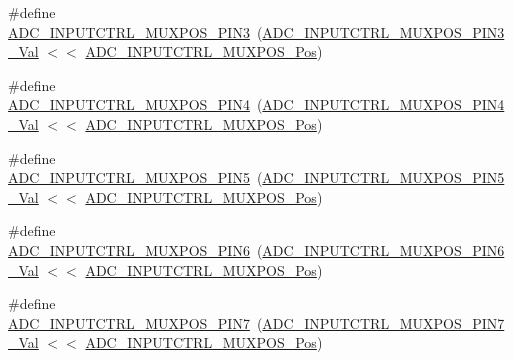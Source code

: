 \begin{DoxyCompactItemize}
\item 
\#define \mbox{\hyperlink{group___s_a_m_d21___a_d_c_gae40aae75717daad66136d38f4aab5745}{A\+D\+C\+\_\+\+I\+N\+P\+U\+T\+C\+T\+R\+L\+\_\+\+M\+U\+X\+P\+O\+S\+\_\+\+P\+I\+N3}}~(\mbox{\hyperlink{group___s_a_m_d21___a_d_c_gab3c2542ab94ed621d288448dea54595e}{A\+D\+C\+\_\+\+I\+N\+P\+U\+T\+C\+T\+R\+L\+\_\+\+M\+U\+X\+P\+O\+S\+\_\+\+P\+I\+N3\+\_\+\+Val}} $<$$<$ \mbox{\hyperlink{group___s_a_m_d21___a_d_c_ga583868be285e1c06c9a93dfd552d8c6a}{A\+D\+C\+\_\+\+I\+N\+P\+U\+T\+C\+T\+R\+L\+\_\+\+M\+U\+X\+P\+O\+S\+\_\+\+Pos}})
\item 
\#define \mbox{\hyperlink{group___s_a_m_d21___a_d_c_ga08cc1ed8edd7fb048b73f4f464fcb647}{A\+D\+C\+\_\+\+I\+N\+P\+U\+T\+C\+T\+R\+L\+\_\+\+M\+U\+X\+P\+O\+S\+\_\+\+P\+I\+N4}}~(\mbox{\hyperlink{group___s_a_m_d21___a_d_c_ga49f7bff2068e3d9c1eb782837f6bfbc1}{A\+D\+C\+\_\+\+I\+N\+P\+U\+T\+C\+T\+R\+L\+\_\+\+M\+U\+X\+P\+O\+S\+\_\+\+P\+I\+N4\+\_\+\+Val}} $<$$<$ \mbox{\hyperlink{group___s_a_m_d21___a_d_c_ga583868be285e1c06c9a93dfd552d8c6a}{A\+D\+C\+\_\+\+I\+N\+P\+U\+T\+C\+T\+R\+L\+\_\+\+M\+U\+X\+P\+O\+S\+\_\+\+Pos}})
\item 
\#define \mbox{\hyperlink{group___s_a_m_d21___a_d_c_ga3216ebfa26a6f8fde97c07a862044b77}{A\+D\+C\+\_\+\+I\+N\+P\+U\+T\+C\+T\+R\+L\+\_\+\+M\+U\+X\+P\+O\+S\+\_\+\+P\+I\+N5}}~(\mbox{\hyperlink{group___s_a_m_d21___a_d_c_ga2a6f31e796d4e1b02b83f35e7d69d6fb}{A\+D\+C\+\_\+\+I\+N\+P\+U\+T\+C\+T\+R\+L\+\_\+\+M\+U\+X\+P\+O\+S\+\_\+\+P\+I\+N5\+\_\+\+Val}} $<$$<$ \mbox{\hyperlink{group___s_a_m_d21___a_d_c_ga583868be285e1c06c9a93dfd552d8c6a}{A\+D\+C\+\_\+\+I\+N\+P\+U\+T\+C\+T\+R\+L\+\_\+\+M\+U\+X\+P\+O\+S\+\_\+\+Pos}})
\item 
\#define \mbox{\hyperlink{group___s_a_m_d21___a_d_c_ga4c1c765900c6aa94d446d3f552bbd490}{A\+D\+C\+\_\+\+I\+N\+P\+U\+T\+C\+T\+R\+L\+\_\+\+M\+U\+X\+P\+O\+S\+\_\+\+P\+I\+N6}}~(\mbox{\hyperlink{group___s_a_m_d21___a_d_c_ga59f103e404660cc83baef875de0f52b7}{A\+D\+C\+\_\+\+I\+N\+P\+U\+T\+C\+T\+R\+L\+\_\+\+M\+U\+X\+P\+O\+S\+\_\+\+P\+I\+N6\+\_\+\+Val}} $<$$<$ \mbox{\hyperlink{group___s_a_m_d21___a_d_c_ga583868be285e1c06c9a93dfd552d8c6a}{A\+D\+C\+\_\+\+I\+N\+P\+U\+T\+C\+T\+R\+L\+\_\+\+M\+U\+X\+P\+O\+S\+\_\+\+Pos}})
\item 
\#define \mbox{\hyperlink{group___s_a_m_d21___a_d_c_gac77f777183ebe2d66247c253f7b67f5b}{A\+D\+C\+\_\+\+I\+N\+P\+U\+T\+C\+T\+R\+L\+\_\+\+M\+U\+X\+P\+O\+S\+\_\+\+P\+I\+N7}}~(\mbox{\hyperlink{group___s_a_m_d21___a_d_c_ga96e1fc1f8598cf906be62766660d3e71}{A\+D\+C\+\_\+\+I\+N\+P\+U\+T\+C\+T\+R\+L\+\_\+\+M\+U\+X\+P\+O\+S\+\_\+\+P\+I\+N7\+\_\+\+Val}} $<$$<$ \mbox{\hyperlink{group___s_a_m_d21___a_d_c_ga583868be285e1c06c9a93dfd552d8c6a}{A\+D\+C\+\_\+\+I\+N\+P\+U\+T\+C\+T\+R\+L\+\_\+\+M\+U\+X\+P\+O\+S\+\_\+\+Pos}})
$$
\end{DoxyCompactItemize}
